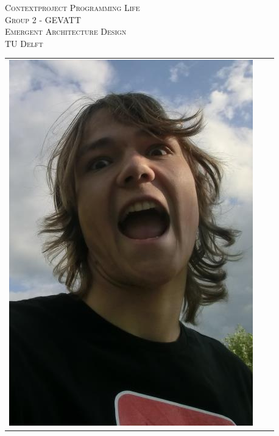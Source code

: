 \begin{titlepage}
\begin{center}
\textsc{\LARGE Contextproject Programming Life}\\
\vspace{5pt}
\textsc{\LARGE Group 2 - GEVATT}\\
\vspace{5pt}
\textsc{\LARGE Emergent Architecture Design}\\
\vspace{5pt}
\textsc{\large TU Delft}

\begin{table}[ht]
\centering
\begin{tabular}{ccc}
\includegraphics[scale=0.2]{../photos/ruben.png}   &

\end{tabular}
\end{table}
\end{center}
\end{titlepage}
